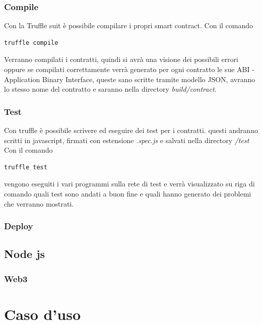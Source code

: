 \documentclass[12pt,titlepage]{report}
\begin{document}
\subsection{Compile}
Con la Truffle suit è possibile compilare i propri smart contract. Con il comando 
\begin{lstlisting}[language=command.com]
truffle compile
\end{lstlisting}
Verranno compilati i contratti, quindi si avrà una visione dei possibili errori oppure se compilati correttamente verrà generato per ogni contratto le sue ABI - Application Binary Interface, queste sano scritte tramite modello JSON, avranno lo stesso nome del contratto e saranno nella directory \textit{build/contract}.

\subsection{Test}
Con truffle è possibile scrivere ed eseguire dei test per i contratti. questi andranno scritti in javascript, firmati con estensione \textit{.spec.js} e salvati nella directory \textit{/test}
Con il comando
\begin{lstlisting}[language=command.com]
truffle test
\end{lstlisting}
vengono eseguiti i vari programmi sulla rete di test e verrà visualizzato su riga di comando quali test sono andati a buon fine e quali hanno generato dei problemi che verranno mostrati.
\subsection{Deploy}
\section{Node js}
\subsection{Web3}

\chapter{Caso d'uso}
\end{document}
